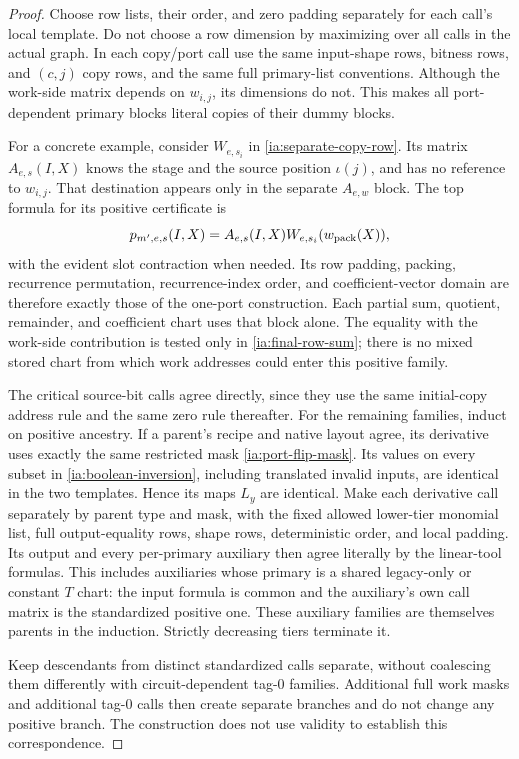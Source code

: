\begin{proof}
Choose row lists, their order, and zero padding separately for each
call's local template.  Do not choose a row dimension by maximizing
over all calls in the actual graph.  In each copy/port call use the
same input-shape rows, bitness rows, and $(c,j)$ copy rows, and the
same full primary-list conventions.  Although the work-side matrix
depends on $w_{i,j}$, its dimensions do not.  This makes all
port-dependent primary blocks literal copies of their dummy blocks.

For a concrete example, consider $W_{e,s_i}$ in
\eqref{ia:separate-copy-row}.  Its matrix $A_{e,s}(I,X)$ knows the
stage and the source position $\iota(j)$, and has no reference to
$w_{i,j}$.  That destination appears only in the separate
$A_{e,w}$ block.  The top formula for its positive certificate is
\[
 p_{m',e,s}(I,X)
       =A_{e,s}(I,X)W_{e,s_i}(w_{\rm pack}(X)),
\]
with the evident slot contraction when needed.  Its row padding,
packing, recurrence permutation, recurrence-index order, and
coefficient-vector domain are therefore exactly those of the
one-port construction.  Each partial sum, quotient, remainder, and
coefficient chart uses that block alone.  The equality with the
work-side contribution is tested only in \eqref{ia:final-row-sum};
there is no mixed stored chart from which work addresses could
enter this positive family.

The critical source-bit calls agree directly, since they use the
same initial-copy address rule and the same zero rule thereafter.
For the remaining families, induct on positive ancestry.  If a
parent's recipe and native layout agree, its derivative uses exactly
the same restricted mask \eqref{ia:port-flip-mask}.  Its values on
every subset in \eqref{ia:boolean-inversion}, including translated
invalid inputs, are identical in the two templates.  Hence its maps
$L_y$ are identical.  Make each derivative call separately by parent
type and mask, with the fixed allowed lower-tier monomial list, full
output-equality rows, shape rows, deterministic order, and local
padding.  Its output and every per-primary auxiliary then agree
literally by the linear-tool formulas.  This includes auxiliaries
whose primary is a shared legacy-only or constant $T$ chart: the
input formula is common and the auxiliary's own call matrix is the
standardized positive one.  These auxiliary families are themselves
parents in the induction.  Strictly decreasing tiers terminate it.

Keep descendants from distinct standardized calls separate, without
coalescing them differently with circuit-dependent tag-$0$ families.
Additional full work masks and additional tag-$0$ calls then create
separate branches and do not change any positive branch.  The
construction does not use validity to establish this correspondence.
\end{proof}

